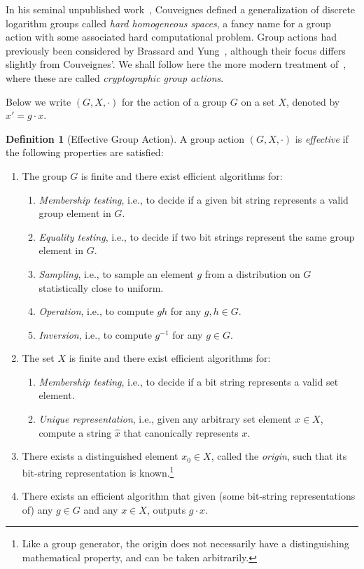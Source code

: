 \documentclass[10pt]{article}
\theoremstyle{plain}
\theoremstyle{definition}
\newtheorem{definition}[theorem]{Definition}
\begin{document}
In his seminal unpublished work~\cite{EPRINT:Couveignes06}, Couveignes
defined a generalization of discrete logarithm groups called
\emph{hard homogeneous spaces}, a fancy name for a group action with
some associated hard computational problem. %
Group actions had previously been considered by Brassard and
Yung~\cite{C:BraYun90}, although their focus differs slightly from
Couveignes'. %
We shall follow here the more modern treatment of~\cite{AC:ADMP20},
where these are called \emph{cryptographic group actions}.

Below we write $(G,X,·)$ for the action of a group $G$ on a set
$X$, denoted by $x' = g·x$.

\begin{definition}[Effective Group Action]
  A group action $(G,X,·)$ is \emph{effective} if the following
  properties are satisfied:
  \begin{enumerate}
  \item The group $G$ is finite and there exist efficient algorithms
    for:
    \begin{enumerate}
    \item \emph{Membership testing}, i.e., to decide if a given bit string
      represents a valid group element in $G$.
    \item \emph{Equality testing}, i.e., to decide if two bit strings
      represent the same group element in $G$.
    \item \emph{Sampling}, i.e., to sample an element $g$ from a
      distribution on $G$ statistically close to uniform.
    \item \emph{Operation}, i.e., to compute $gh$ for any $g,h\in G$.
    \item \emph{Inversion}, i.e., to compute $g^{-1}$ for any
      $g\in G$.
    \end{enumerate}
  \item The set $X$ is finite and there exist efficient algorithms for:
    \begin{enumerate}
    \item \emph{Membership testing}, i.e., to decide if a bit string
      represents a valid set element.
    \item \emph{Unique representation}, i.e., given any arbitrary set element $x\in X$, compute a string $\hat{x}$ that canonically represents $x$.
    \end{enumerate}
  \item There exists a distinguished element $x_0\in X$, called the
    \emph{origin}, such that its bit-string representation is
    known.\footnote{Like a group generator, the origin does not
      necessarily have a distinguishing mathematical property, and can
      be taken arbitrarily.}
  \item There exists an efficient algorithm that given (some
    bit-string representations of) any $g\in G$ and any $x\in X$,
    outputs $g · x$.
  \end{enumerate}
\end{definition}
\end{document}
